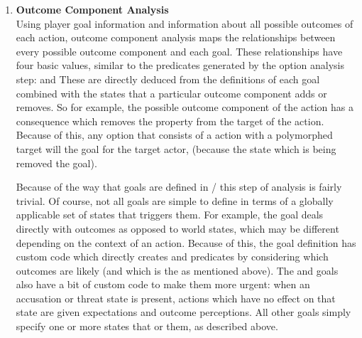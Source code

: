 \begin{enumerate}
\item %
\textbf{Outcome Component Analysis} \\
%
Using player goal information and information about all possible outcomes of each action, outcome component analysis maps the relationships between every possible outcome component and each goal.
%
These relationships have four basic values, similar to the  predicates generated by the option analysis step:    and 
%
These are directly deduced from the definitions of each goal combined with the states that a particular outcome component adds or removes.
%
So for example, the  possible outcome component of the  action has a consequence which removes the  property from the target of the action.
%
Because of this, any option that consists of a  action with a polymorphed target will  the  goal for the target actor, (because the  state which is being removed  the  goal).

Because of the way that goals are defined in \dunyazad/ this step of analysis is fairly trivial.
%
Of course, not all goals are simple to define in terms of a globally applicable set of states that triggers them.
%
For example, the  goal deals directly with outcomes as opposed to world states, which may be different depending on the context of an action.
%
Because of this, the  goal definition has custom code which directly creates  and  predicates by considering which outcomes are likely (and which is the  as mentioned above).
%
The  and  goals also have a bit of custom code to make them more urgent: when an accusation or threat state is present, actions which have no effect on that state are given  expectations and  outcome perceptions.
%
All other goals simply specify one or more states that    or  them, as described above.


\end{enumerate}
